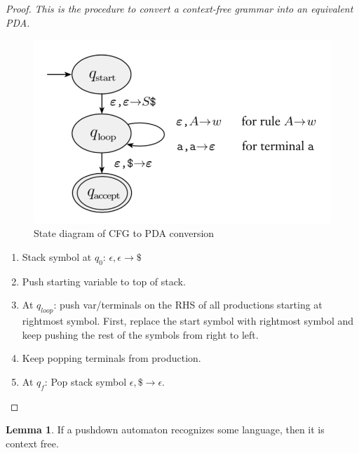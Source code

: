 \documentclass[11pt]{article}
\theoremstyle{definition}
\newtheorem{lemma}[thm]{Lemma}
\begin{document}
\begin{proof}
    \textit{This is the procedure to convert a context-free grammar into an equivalent PDA.}
        \begin{figure}[H]
    	\centering
    	\includegraphics[width=0.5\linewidth]{CFGPDA.png}
    	\caption{State diagram of CFG to PDA conversion}
    	\label{fig}
    \end{figure}
    \begin{enumerate}
        \item Stack symbol at $q_0$: $\epsilon,\epsilon\to \$$
        \item Push starting variable to top of stack.
        \item At $q_{loop}$: push var/terminals on the RHS of all productions starting at rightmost symbol. First, replace the start symbol with rightmost symbol and keep pushing the rest of the symbols from right to left.
        \item Keep popping terminals from production.
        \item At $q_f$: Pop stack symbol $\epsilon,\$\to\epsilon$.
    \end{enumerate}
\end{proof}
\begin{lemma}
If a pushdown automaton recognizes some language, then it is context free.
\end{lemma}
\end{document}

